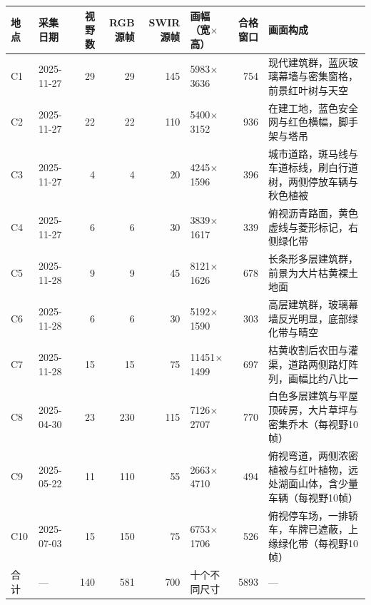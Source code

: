 \begin{tabularx}{\textwidth}{@{}llrrrlr>{\raggedright\arraybackslash}X@{}}
\toprule
地点 & 采集日期 & 视野数 & RGB源帧 & SWIR源帧 & 画幅（宽$\times$高） & 合格窗口 & 画面构成 \\
\midrule
C1 & 2025-11-27 & 29 & 29 & 145 & 5983$\times$3636 & 754 & 现代建筑群，蓝灰玻璃幕墙与密集窗格，前景红叶树与天空 \\
C2 & 2025-11-27 & 22 & 22 & 110 & 5400$\times$3152 & 936 & 在建工地，蓝色安全网与红色横幅，脚手架与塔吊 \\
C3 & 2025-11-27 & 4 & 4 & 20 & 4245$\times$1596 & 396 & 城市道路，斑马线与车道标线，刷白行道树，两侧停放车辆与秋色植被 \\
C4 & 2025-11-27 & 6 & 6 & 30 & 3839$\times$1617 & 339 & 俯视沥青路面，黄色虚线与菱形标记，右侧绿化带 \\
C5 & 2025-11-28 & 9 & 9 & 45 & 8121$\times$1626 & 678 & 长条形多层建筑群，前景为大片枯黄裸土地面 \\
C6 & 2025-11-28 & 6 & 6 & 30 & 5192$\times$1590 & 303 & 高层建筑群，玻璃幕墙反光明显，底部绿化带与晴空 \\
C7 & 2025-11-28 & 15 & 15 & 75 & 11451$\times$1499 & 697 & 枯黄收割后农田与灌渠，道路两侧路灯阵列，画幅比约八比一 \\
C8 & 2025-04-30 & 23 & 230 & 115 & 7126$\times$2707 & 770 & 白色多层建筑与平屋顶砖房，大片草坪与密集乔木（每视野10帧） \\
C9 & 2025-05-22 & 11 & 110 & 55 & 2663$\times$4710 & 494 & 俯视弯道，两侧浓密植被与红叶植物，远处湖面山体，含少量车辆（每视野10帧） \\
C10 & 2025-07-03 & 15 & 150 & 75 & 6753$\times$1706 & 526 & 俯视停车场，一排轿车，车牌已遮蔽，上缘绿化带（每视野10帧） \\
\midrule
合计 & --- & 140 & 581 & 700 & 十个不同尺寸 & 5893 & --- \\
\bottomrule
\end{tabularx}
